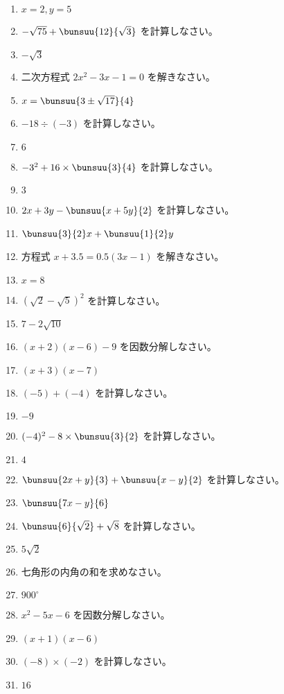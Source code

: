 \documentclass[uplatex,a4j,11pt]{jsreport}
\begin{document}
\begin{multicols}{2}
\begin{enumerate}
    \item $x=2, y=5$
    \item $-\sqrt{75}+\bunsuu{12}{\sqrt{3}}$ を計算しなさい。%
    \item $-\sqrt{3}$
    \item 二次方程式 $2x^2-3x-1=0$ を解きなさい。%
    \item $x=\bunsuu{3\pm\sqrt{17}}{4}$
    \item $-18\div(-3)$ を計算しなさい。%
    \item $6$
    \item $-3^2+16\times\bunsuu{3}{4}$ を計算しなさい。%
    \item $3$
    \item $2x+3y-\bunsuu{x+5y}{2}$ を計算しなさい。%
    \item $\bunsuu{3}{2}x+\bunsuu{1}{2}y$
    \item 方程式 $x+3.5=0.5(3x-1)$ を解きなさい。%
    \item $x=8$
    \item $(\sqrt{2}-\sqrt{5})^2$ を計算しなさい。%
    \item $7-2\sqrt{10}$
    \item $(x+2)(x-6)-9$ を因数分解しなさい。%
    \item $(x+3)(x-7)$
    \item $(-5)+(-4)$ を計算しなさい。%
    \item $-9$
    \item $(-4)^2-8\times\bunsuu{3}{2}$ を計算しなさい。%
    \item $4$
    \item $\bunsuu{2x+y}{3}+\bunsuu{x-y}{2}$ を計算しなさい。%
    \item $\bunsuu{7x-y}{6}$
    \item $\bunsuu{6}{\sqrt{2}}+\sqrt{8}$ を計算しなさい。%
    \item $5\sqrt{2}$
    \item 七角形の内角の和を求めなさい。%
    \item $900^\circ$
    \item $x^2-5x-6$ を因数分解しなさい。%
    \item $(x+1)(x-6)$
    \item $(-8)\times(-2)$ を計算しなさい。%
    \item $16$

\end{enumerate}
\end{multicols}
\end{document}
